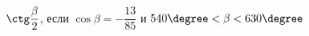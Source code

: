 \begin{ex}[type=simplify_calculate]
	\begin{condition}
		\( \ctg\dfrac{\beta}{2} \), \quad если \( \cos\beta=-\dfrac{13}{85} \) и \( 540\degree<\beta<630\degree \)
	\end{condition}
\end{ex}